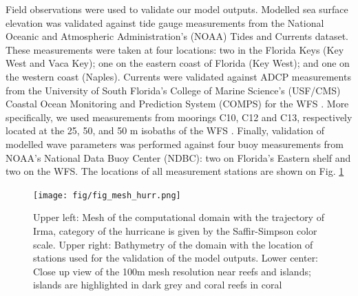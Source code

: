 \documentclass[11pt,a4paper]{article}
\begin{document}
Field observations were used to validate our model outputs. Modelled sea surface elevation was validated against tide gauge measurements from the National Oceanic and Atmospheric Administration’s (NOAA) Tides and Currents dataset. These measurements were taken at four locations: two in the Florida Keys (Key West and Vaca Key); one on the eastern coast of Florida (Key West); and one on the western coast (Naples). Currents were validated against ADCP measurements from the University of South Florida's College of Marine Science's (USF/CMS) Coastal Ocean Monitoring and Prediction System (COMPS) for the WFS \citep{weisberg2009mean}. More specifically, we used measurements from moorings C10, C12 and C13, respectively located at the 25, 50, and 50 m isobaths of the WFS \citep{liu2020impacts}. Finally, validation of modelled wave parameters was performed against four buoy measurements from NOAA's National Data Buoy Center (NDBC): two on Florida's Eastern shelf and two on the WFS. The locations of all measurement stations are shown on Fig. \ref{fig:mesh}

\begin{figure}
    \centering
    \texttt{[image: fig/fig\_mesh\_hurr.png]}
    \caption{Upper left: Mesh of the computational domain with the trajectory of Irma, category of the hurricane is given by the Saffir-Simpson color scale. Upper right: Bathymetry of the domain with the location of stations used for the validation of the model outputs. Lower center: Close up view of the 100m mesh resolution near reefs and islands; islands are highlighted in dark grey and coral reefs in coral}
    \label{fig:mesh}
\end{figure}
\end{document}
